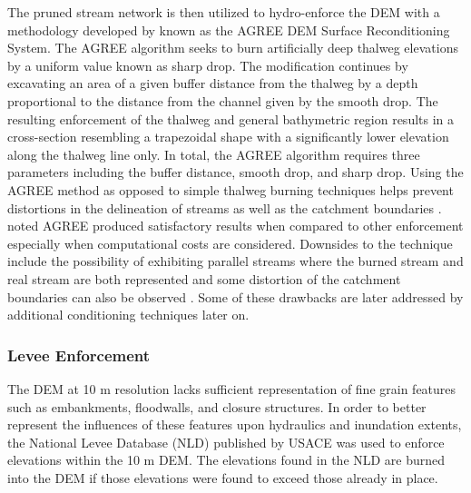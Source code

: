 The pruned stream network is then utilized to hydro-enforce the DEM with a methodology developed by  known as the AGREE DEM Surface Reconditioning System. 
The AGREE algorithm seeks to burn artificially deep thalweg elevations by a uniform value known as sharp drop. 
The modification continues by excavating an area of a given buffer distance from the thalweg by a depth proportional to the distance from the channel given by the smooth drop. 
The resulting enforcement of the thalweg and general bathymetric region results in a cross-section resembling a trapezoidal shape with a significantly lower elevation along the thalweg line only.
In total, the AGREE algorithm requires three parameters including the buffer distance, smooth drop, and sharp drop. 
Using the AGREE method as opposed to simple thalweg burning techniques helps prevent distortions in the delineation of streams as well as the catchment boundaries \cite{saunders1995grid,saunders1996gis,mizgalewicz1996modeling,hellweger1997agree,quenzer1998gis,baker2006comparison}.
 noted AGREE produced satisfactory results when compared to other enforcement especially when computational costs are considered. 
Downsides to the technique include the possibility of exhibiting parallel streams where the burned stream and real stream are both represented \cite{hellweger1997agree,saunders1999preparation} and some distortion of the catchment boundaries can also be observed \cite{saunders1999preparation,saunders1996gis}. Some of these drawbacks are later addressed by additional conditioning techniques later on.
%
\subsubsection{Levee Enforcement}
%
The DEM at 10 m resolution lacks sufficient representation of fine grain features such as embankments, floodwalls, and closure structures.
In order to better represent the influences of these features upon hydraulics and inundation extents, the National Levee Database (NLD) published by USACE was used to enforce elevations within the 10 m DEM.
The elevations found in the NLD are burned into the DEM if those elevations were found to exceed those already in place.
%
